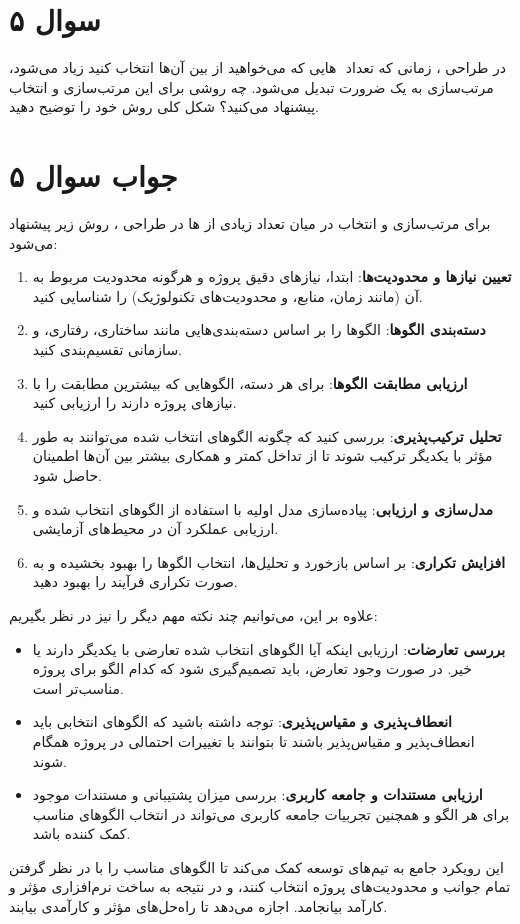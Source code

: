 \section*{سوال ۵}

در طراحی
، زمانی که تعداد
‌
هایی که می‌خواهید از بین آن‌ها انتخاب کنید زیاد می‌شود، مرتب‌سازی به یک ضرورت تبدیل می‌شود. چه روشی برای این مرتب‌سازی و انتخاب پیشنهاد می‌کنید؟ شکل کلی روش خود را توضیح دهید.


\section*{جواب سوال ۵}

برای مرتب‌سازی و انتخاب در میان تعداد زیادی از ‌ها در طراحی ، روش زیر پیشنهاد می‌شود:

\begin{enumerate}
	\item \textbf{تعیین نیازها و محدودیت‌ها}: ابتدا، نیازهای دقیق پروژه و هرگونه محدودیت مربوط به آن (مانند زمان، منابع، و محدودیت‌های تکنولوژیک) را شناسایی کنید.
	
	\item \textbf{دسته‌بندی الگوها}: الگوها را بر اساس دسته‌بندی‌هایی مانند ساختاری، رفتاری، و سازمانی تقسیم‌بندی کنید.
	
	\item \textbf{ارزیابی مطابقت الگوها}: برای هر دسته، الگوهایی که بیشترین مطابقت را با نیازهای پروژه دارند را ارزیابی کنید.
	
	\item \textbf{تحلیل ترکیب‌پذیری}: بررسی کنید که چگونه الگوهای انتخاب شده می‌توانند به طور مؤثر با یکدیگر ترکیب شوند تا از تداخل کمتر و همکاری بیشتر بین آن‌ها اطمینان حاصل شود.
	
	\item \textbf{مدل‌سازی و ارزیابی}: پیاده‌سازی مدل اولیه با استفاده از الگوهای انتخاب شده و ارزیابی عملکرد آن در محیط‌های آزمایشی.
	
	\item \textbf{افزایش تکراری}: بر اساس بازخورد و تحلیل‌ها، انتخاب الگوها را بهبود بخشیده و به صورت تکراری فرآیند را بهبود دهید.
\end{enumerate}

علاوه بر این، می‌توانیم چند نکته مهم دیگر را نیز در نظر بگیریم:

\begin{itemize}
	\item \textbf{بررسی تعارضات}: ارزیابی اینکه آیا الگوهای انتخاب شده تعارضی با یکدیگر دارند یا خیر. در صورت وجود تعارض، باید تصمیم‌گیری شود که کدام الگو برای پروژه مناسب‌تر است.
	
	\item \textbf{انعطاف‌پذیری و مقیاس‌پذیری}: توجه داشته باشید که الگوهای انتخابی باید انعطاف‌پذیر و مقیاس‌پذیر باشند تا بتوانند با تغییرات احتمالی در پروژه همگام شوند.
	
	\item \textbf{ارزیابی مستندات و جامعه کاربری}: بررسی میزان پشتیبانی و مستندات موجود برای هر الگو و همچنین تجربیات جامعه کاربری می‌تواند در انتخاب الگوهای مناسب کمک کننده باشد.
\end{itemize}

این رویکرد جامع به تیم‌های توسعه کمک می‌کند تا الگوهای مناسب را با در نظر گرفتن تمام جوانب و محدودیت‌های پروژه انتخاب کنند، و در نتیجه به ساخت نرم‌افزاری مؤثر و کارآمد بیانجامد. اجازه می‌دهد تا راه‌حل‌های مؤثر و کارآمدی بیابند.